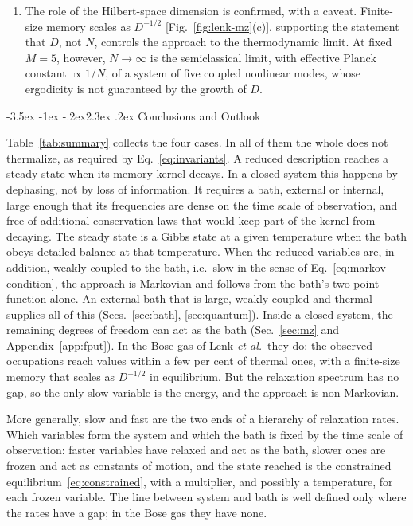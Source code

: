 \documentclass[10pt,a4paper]{article}
\makeatletter
\renewcommand{\section}{\@startsection{section}{1}{\z@}%
  {-3.5ex \@plus -1ex \@minus -.2ex}{2.3ex \@plus .2ex}%
  {\normalfont\fontsize{18pt}{22pt}\selectfont\bfseries}}
\makeatother
\begin{document}
\begin{enumerate}[label=(\alph*), leftmargin=2.2em]
\item The role of the Hilbert-space dimension is confirmed, with a caveat. Finite-size memory scales as $ D^{-1/2} $ [Fig.~\ref{fig:lenk-mz}(c)], supporting the statement that $ D $, not $ N $, controls the approach to the thermodynamic limit. At fixed $ M = 5 $, however, $ N \to \infty $ is the semiclassical limit, with effective Planck constant $ \propto 1/N $, of a system of five coupled nonlinear modes, whose ergodicity is not guaranteed by the growth of $ D $.
\end{enumerate}

\section{Conclusions and Outlook}
\label{sec:conclusion}

Table~\ref{tab:summary} collects the four cases.
In all of them the whole does not thermalize, as required by Eq.~\eqref{eq:invariants}.
A reduced description reaches a steady state when its memory kernel decays.
In a closed system this happens by dephasing, not by loss of information. It requires a bath, external or internal, large enough that its frequencies are dense on the time scale of observation, and free of additional conservation laws that would keep part of the kernel from decaying.
The steady state is a Gibbs state at a given temperature when the bath obeys detailed balance at that temperature.
When the reduced variables are, in addition, weakly coupled to the bath, i.e.\ slow in the sense of Eq.~\eqref{eq:markov-condition}, the approach is Markovian and follows from the bath's two-point function alone.
An external bath that is large, weakly coupled and thermal supplies all of this (Secs.~\ref{sec:bath}, \ref{sec:quantum}).
Inside a closed system, the remaining degrees of freedom can act as the bath (Sec.~\ref{sec:mz} and Appendix~\ref{app:fput}).
In the Bose gas of Lenk \textit{et al.}\ they do: the observed occupations reach values within a few per cent of thermal ones, with a finite-size memory that scales as $ D^{-1/2} $ in equilibrium. But the relaxation spectrum has no gap, so the only slow variable is the energy, and the approach is non-Markovian.

More generally, slow and fast are the two ends of a hierarchy of relaxation rates.
Which variables form the system and which the bath is fixed by the time scale of observation: faster variables have relaxed and act as the bath, slower ones are frozen and act as constants of motion, and the state reached is the constrained equilibrium~\eqref{eq:constrained}, with a multiplier, and possibly a temperature, for each frozen variable.
The line between system and bath is well defined only where the rates have a gap; in the Bose gas they have none.
\end{document}
